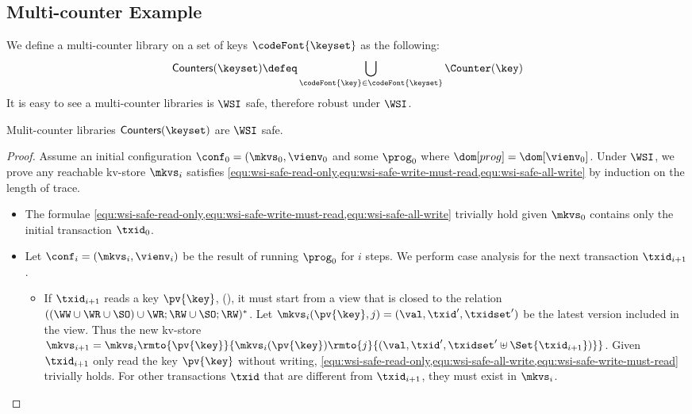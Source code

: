 \subsection{Multi-counter Example}
We define a multi-counter library on a set of keys \( \codeFont{\keyset} \) as the following:
\[
    \mathsf{Counters(\keyset)} \defeq \bigcup_{\codeFont{\key} \in \codeFont{\keyset} } \Counter(\key)
\]
It is easy to see a multi-counter libraries is \( \WSI \) safe, therefore robust under \( \WSI \).
\begin{theorem}
    Mulit-counter libraries \( \mathsf{Counters(\keyset)}  \) are \( \WSI \) safe.
\end{theorem}
\begin{proof}
    Assume an initial configuration \( \conf_0 = (\mkvs_0, \vienv_0 \) 
    and some \( \prog_0 \) where \( \dom[prog] = \dom[\vienv_0] \).
    Under \( \WSI \), we prove any reachable kv-store \( \mkvs_i \) satisfies \cref{equ:wsi-safe-read-only,equ:wsi-safe-write-must-read,equ:wsi-safe-all-write} by induction on the length of trace.
    \begin{itemize}
        \item {} 
            The formulae \cref{equ:wsi-safe-read-only,equ:wsi-safe-write-must-read,equ:wsi-safe-all-write} trivially hold given \( \mkvs_0 \) contains only the initial transaction \( \txid_0 \).
        \item {}
            Let \( \conf_i = (\mkvs_i, \vienv_i)\) be the result of running \( \prog_0 \) for \( i \) steps.
            We perform case analysis for the next transaction \( \txid_{i+1} \).
            \begin{itemize}
                \item If \( \txid_{i+1}\) reads a key \( \pv{\key} \), \ie \ctrread(\pv{\key}),
                    it must start from a view that is closed to the relation \( (  (\WW \cup \WR \cup \SO) \cup \WR;\RW \cup \SO;\RW )^* \).
                    Let \( \mkvs_i(\pv{\key},j) = (\val, \txid', \txidset') \) be the latest version included in the view.
                    Thus the new kv-store \( \mkvs_{i+1} = \mkvs_{i}\rmto{\pv{\key}}{\mkvs_i(\pv{\key})\rmto{j}{(\val, \txid', \txidset' \uplus \Set{\txid_{i+1}})}} \).
                    Given \( \txid_{i+1} \) only read the key \( \pv{\key} \) without writing, \cref{equ:wsi-safe-read-only,equ:wsi-safe-all-write,equ:wsi-safe-write-must-read} trivially holds.
                    For other transactions \( \txid \) that are different from \( \txid_{i+1} \), they must exist in \( \mkvs_i \).

\end{itemize}
\end{itemize}
\end{proof}
